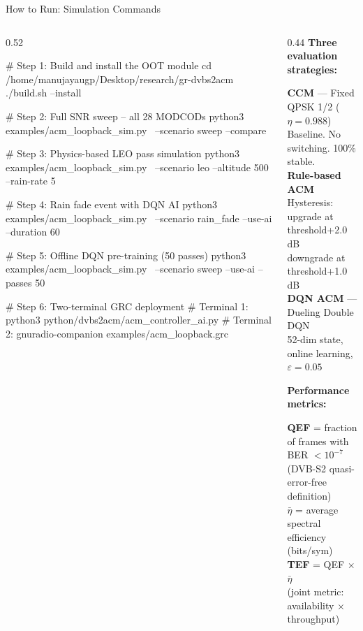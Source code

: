 \documentclass[aspectratio=169,10pt]{beamer}
\begin{document}
\begin{frame}[fragile,shrink=20]{How to Run: Simulation Commands}
  \begin{columns}[T]
    \begin{column}{0.52\textwidth}
\begin{terminal}
# Step 1: Build and install the OOT module
cd /home/manujayaugp/Desktop/research/gr-dvbs2acm
./build.sh --install

# Step 2: Full SNR sweep -- all 28 MODCODs
python3 examples/acm_loopback_sim.py \
    --scenario sweep --compare

# Step 3: Physics-based LEO pass simulation
python3 examples/acm_loopback_sim.py \
    --scenario leo --altitude 500 --rain-rate 5

# Step 4: Rain fade event with DQN AI
python3 examples/acm_loopback_sim.py \
    --scenario rain_fade --use-ai --duration 60

# Step 5: Offline DQN pre-training (50 passes)
python3 examples/acm_loopback_sim.py \
    --scenario sweep --use-ai --passes 50

# Step 6: Two-terminal GRC deployment
# Terminal 1:
python3 python/dvbs2acm/acm_controller_ai.py
# Terminal 2:
gnuradio-companion examples/acm_loopback.grc
\end{terminal}
    \end{column}
    \begin{column}{0.44\textwidth}
      \textbf{Three evaluation strategies:}
      \begin{tcolorbox}[colback=NUSblue!6,colframe=NUSblue,arc=3pt,
                        left=4pt,right=4pt,top=3pt,bottom=3pt]
        \scriptsize
        \textbf{CCM} --- Fixed QPSK 1/2 ($\eta=0.988$)\\
        Baseline. No switching. 100\% stable.\\[0.3em]
        \textbf{Rule-based ACM}\\
        Hysteresis: upgrade at threshold+2.0 dB\\
        downgrade at threshold+1.0 dB\\[0.3em]
        \textbf{DQN ACM} --- Dueling Double DQN\\
        52-dim state, online learning, $\varepsilon=0.05$
      \end{tcolorbox}

      \vspace{0.3em}
      \textbf{Performance metrics:}
      \begin{tcolorbox}[colback=NUSorange!6,colframe=NUSorange,arc=3pt,
                        left=4pt,right=4pt,top=3pt,bottom=3pt]
        \scriptsize
        \textbf{QEF} = fraction of frames with BER $<10^{-7}$\\
        \quad (DVB-S2 quasi-error-free definition)\\
        $\bar{\eta}$ = average spectral efficiency (bits/sym)\\
        \textbf{TEF} = QEF $\times$ $\bar{\eta}$\\
        \quad (joint metric: availability $\times$ throughput)
      \end{tcolorbox}


\end{column}
\end{columns}
\end{frame}
\end{document}
